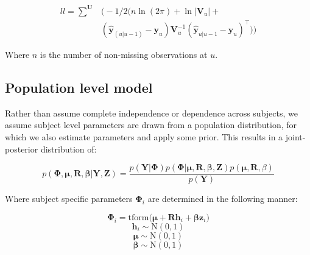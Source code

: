 \documentclass[nojss]{jss}\usepackage[]{graphicx}\usepackage[]{color}
\newcommand{\vect}[1]{\boldsymbol{\mathbf{#1}}}
\begin{document}
\begin{equation}
\begin{split}
ll=\sum^{\vect{U}} & \bigg(   -1/2 (n \ln (2 \pi) + \ln \big| \vect{V}_{u} \big| + \\
& ( \hat{\vect{y}}_{(u|u-1)} - \vect{y}_u )  \vect{V}^{-1}_{u}   ( \hat{\vect{y}}_{u|u-1} - \vect{y}_u )^\top) \bigg)
\end{split}
\end{equation}

Where $n$ is the number of non-missing observations at $u$. 

\subsection{Population level model}
Rather than assume complete independence or dependence across subjects, we assume subject level parameters are drawn from a population distribution, for which we also estimate parameters and apply some prior. This results in a joint-posterior distribution of:

\begin{equation}
p(\vect{\Phi},\vect{\mu},\vect{R},\vect{\beta} | \vect{Y}, \vect{Z}) =  \frac{ p(\vect{Y} | \vect{\Phi}) p(\vect{\Phi} | \vect{\mu},\vect{R},\vect{\beta}, \vect{Z}) p(\vect{\mu},\vect{R},\beta)}{p(\vect{Y})}
\end{equation}

Where subject specific parameters $\vect{\Phi}_i$ are determined in the following manner:

\begin{equation}
\label{eq:subjectparams}
\vect{\Phi}_i = \text{tform} \bigg(\vect{\mu} + \vect{Rh}_i + \vect{\beta} \vect{z}_i \bigg)
\end{equation}  
\begin{equation}
\vect{h}_i \sim \mathrm{N}(0,1)
\end{equation}  
\begin{equation}
\vect{\mu} \sim \mathrm{N}(0, 1)
\end{equation}  
\begin{equation}
\vect{\beta} \sim \mathrm{N}(0, 1)
\end{equation}  
\end{document}
